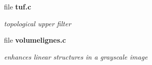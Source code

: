 \begin{CompactItemize}
\item 
file {\bf tuf.c}
\begin{CompactList}\small\item\em topological upper filter \item\end{CompactList}

\item 
file {\bf volumelignes.c}
\begin{CompactList}\small\item\em enhances linear structures in a grayscale image \item\end{CompactList}

\end{CompactItemize}
